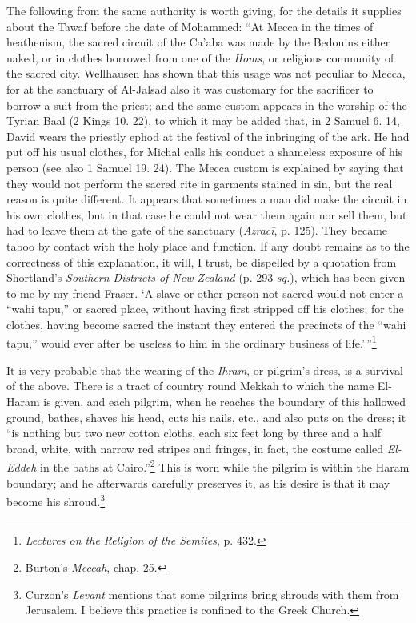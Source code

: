 \documentclass[a4paper, 11pt, oneside, polutonikogreek, english]{article}
\begin{document}
The following from the same authority is worth giving, for the details it supplies about the Tawaf before the date of Mohammed: ``At Mecca in the times of heathenism, the sacred circuit of the Ca'aba was made by the Bedouins either naked, or in clothes borrowed from one of the \emph{Homs}, or religious community of the sacred city. Wellhausen has shown that this usage was not peculiar to Mecca, for at the sanctuary of Al-Jalsad also it was customary for the sacrificer to borrow a suit from the priest; and the same custom appears in the worship of the Tyrian Baal (2 Kings 10. 22), to which it may be added that, in 2 Samuel 6. 14, David wears the priestly ephod at the festival of the inbringing of the ark. He had put off his usual clothes, for Michal calls his conduct a shameless exposure of his person (see also 1 Samuel 19. 24). The Mecca custom is explained by saying that they would not perform the sacred rite in garments stained in sin, but the real reason is quite different. It appears that sometimes a man did make the circuit in his own clothes, but in that case he could not wear them again nor sell them, but had to leave them at the gate of the sanctuary (\emph{Azracī}, p. 125). They became taboo by contact with the holy place and function. If any doubt remains as to the correctness of this explanation, it will, I trust, be dispelled by a quotation from Shortland's \emph{Southern Districts of New Zealand} (p. 293 \emph{sq.}), which has been given to me by my friend Fraser. `A slave or other person not sacred would not enter a ``wahi tapu,'' or sacred place, without having first stripped off his clothes; for the clothes, having become sacred the instant they entered the precincts of the ``wahi tapu,'' would ever after be useless to him in the ordinary business of life.'\,''\footnote{\emph{Lectures on the Religion of the Semites}, p. 432.}

It is very probable that the wearing of the \emph{Ihram}, or pilgrim's dress, is a survival of the above. There is a tract of country round Mekkah to which the name El-Haram is given, and each pilgrim, when he reaches the boundary of this hallowed ground, bathes, shaves his head, cuts his nails, etc., and also puts on the dress; it ``is nothing but two new cotton cloths, each six feet long by three and a half broad, white, with narrow red stripes and fringes, in fact, the costume called \emph{El-Eddeh} in the baths at Cairo.''\footnote{Burton's \emph{Meccah}, chap. 25.} This is worn while the pilgrim is within the Haram boundary; and he afterwards carefully preserves it, as his desire is that it may become his shroud.\footnote{Curzon's \emph{Levant} mentions that some pilgrims bring shrouds with them from Jerusalem. I believe this practice is confined to the Greek Church.}
\end{document}
